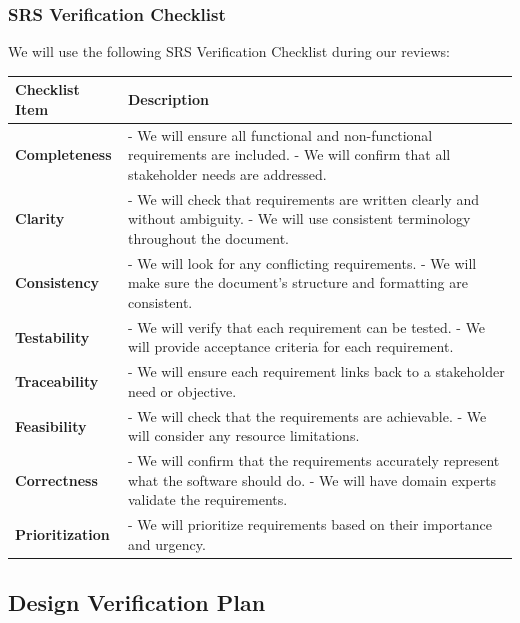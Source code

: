 \documentclass[12pt, titlepage]{article}
\begin{document}
\subsubsection{SRS Verification Checklist}
We will use the following SRS Verification Checklist during our reviews:
\begin{longtable}{|p{}|p{}|}
  \hline
  \textbf{Checklist Item} & \textbf{Description} \\ \hline
  \textbf{Completeness} & 
  - We will ensure all functional and non-functional requirements are included. \newline
  - We will confirm that all stakeholder needs are addressed. \\ \hline
  \textbf{Clarity} & 
  - We will check that requirements are written clearly and without ambiguity. \newline
  - We will use consistent terminology throughout the document. \\ \hline
  \textbf{Consistency} & 
  - We will look for any conflicting requirements. \newline
  - We will make sure the document's structure and formatting are consistent. \\ \hline
  \textbf{Testability} & 
  - We will verify that each requirement can be tested. \newline
  - We will provide acceptance criteria for each requirement. \\ \hline
  \textbf{Traceability} & 
  - We will ensure each requirement links back to a stakeholder need or objective. \\ \hline
  \textbf{Feasibility} & 
  - We will check that the requirements are achievable. \newline
  - We will consider any resource limitations. \\ \hline
  \textbf{Correctness} & 
  - We will confirm that the requirements accurately represent what the software should do. \newline
  - We will have domain experts validate the requirements. \\ \hline
  \textbf{Prioritization} & 
  - We will prioritize requirements based on their importance and urgency. \\ \hline
  \end{longtable}

\subsection{Design Verification Plan}
\end{document}
